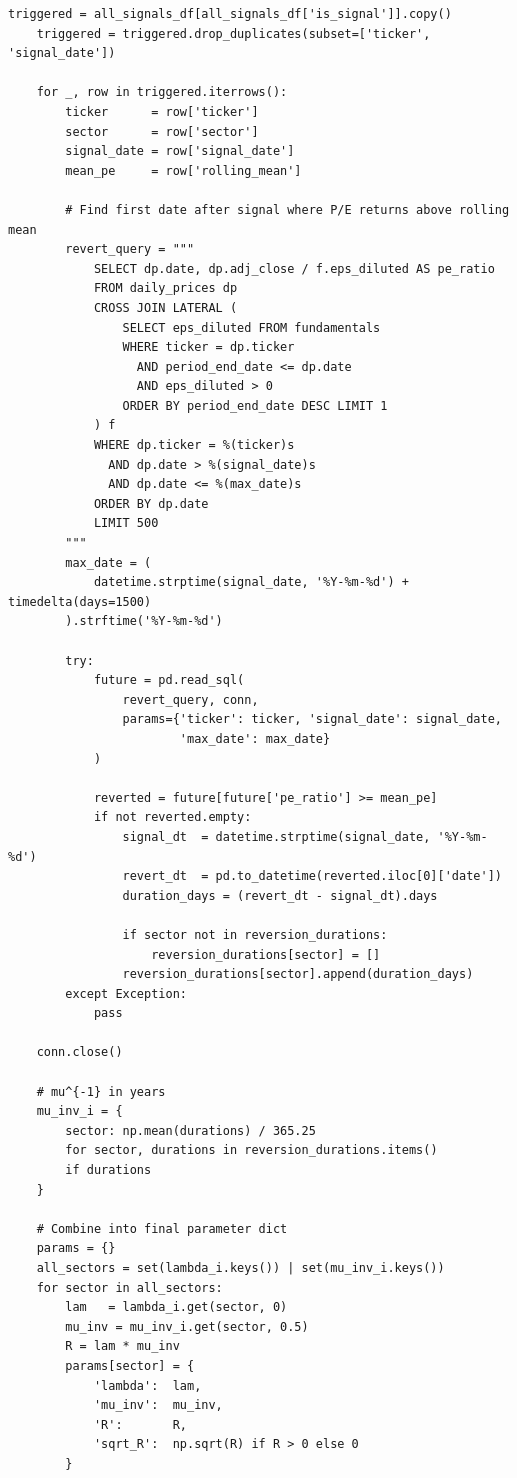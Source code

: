 \documentclass[11pt, oneside]{book}
\begin{document}
\begin{lstlisting}[style=pythonstyle, caption={M/G/Infinity Parameter Extraction}]
    triggered = all_signals_df[all_signals_df['is_signal']].copy()
    triggered = triggered.drop_duplicates(subset=['ticker', 'signal_date'])

    for _, row in triggered.iterrows():
        ticker      = row['ticker']
        sector      = row['sector']
        signal_date = row['signal_date']
        mean_pe     = row['rolling_mean']

        # Find first date after signal where P/E returns above rolling mean
        revert_query = """
            SELECT dp.date, dp.adj_close / f.eps_diluted AS pe_ratio
            FROM daily_prices dp
            CROSS JOIN LATERAL (
                SELECT eps_diluted FROM fundamentals
                WHERE ticker = dp.ticker
                  AND period_end_date <= dp.date
                  AND eps_diluted > 0
                ORDER BY period_end_date DESC LIMIT 1
            ) f
            WHERE dp.ticker = %(ticker)s
              AND dp.date > %(signal_date)s
              AND dp.date <= %(max_date)s
            ORDER BY dp.date
            LIMIT 500
        """
        max_date = (
            datetime.strptime(signal_date, '%Y-%m-%d') + timedelta(days=1500)
        ).strftime('%Y-%m-%d')

        try:
            future = pd.read_sql(
                revert_query, conn,
                params={'ticker': ticker, 'signal_date': signal_date,
                        'max_date': max_date}
            )

            reverted = future[future['pe_ratio'] >= mean_pe]
            if not reverted.empty:
                signal_dt  = datetime.strptime(signal_date, '%Y-%m-%d')
                revert_dt  = pd.to_datetime(reverted.iloc[0]['date'])
                duration_days = (revert_dt - signal_dt).days

                if sector not in reversion_durations:
                    reversion_durations[sector] = []
                reversion_durations[sector].append(duration_days)
        except Exception:
            pass

    conn.close()

    # mu^{-1} in years
    mu_inv_i = {
        sector: np.mean(durations) / 365.25
        for sector, durations in reversion_durations.items()
        if durations
    }

    # Combine into final parameter dict
    params = {}
    all_sectors = set(lambda_i.keys()) | set(mu_inv_i.keys())
    for sector in all_sectors:
        lam   = lambda_i.get(sector, 0)
        mu_inv = mu_inv_i.get(sector, 0.5)
        R = lam * mu_inv
        params[sector] = {
            'lambda':  lam,
            'mu_inv':  mu_inv,
            'R':       R,
            'sqrt_R':  np.sqrt(R) if R > 0 else 0
        }


\end{lstlisting}
\end{document}
